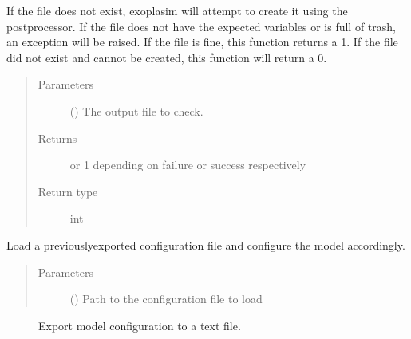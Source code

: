 \documentclass[letterpaper,10pt,english]{sphinxmanual}
\begin{document}
\begin{fulllineitems}
\begin{fulllineitems}
If the file does not exist, exoplasim will attempt to create it using the postprocessor.
If the file does not have the expected variables or is full of trash, an exception will
be raised. If the file is fine, this function returns a 1. If the file did not exist and
cannot be created, this function will return a 0.
\begin{quote}\begin{description}
\item[{Parameters}] \leavevmode
{} () \textendash{} The output file to check.

\item[{Returns}]  or 1 depending on failure or success respectively

\item[{Return type}] \leavevmode
int

\end{description}\end{quote}

\end{fulllineitems}


\begin{fulllineitems}
\label{\detokenize{source/exoplasim:exoplasim.Model.loadconfig}}
Load a previously\sphinxhyphen{}exported configuration file and configure the model accordingly.
\begin{quote}\begin{description}
\item[{Parameters}] \leavevmode
{} () \textendash{} Path to the configuration file to load

\end{description}\end{quote}



\begin{description}
\item[{{\hyperref[\detokenize{source/exoplasim:exoplasim.Model.exportcfg}]{}}}] \leavevmode
Export model configuration to a text file.


\end{description}
\end{fulllineitems}
\end{fulllineitems}
\end{document}
